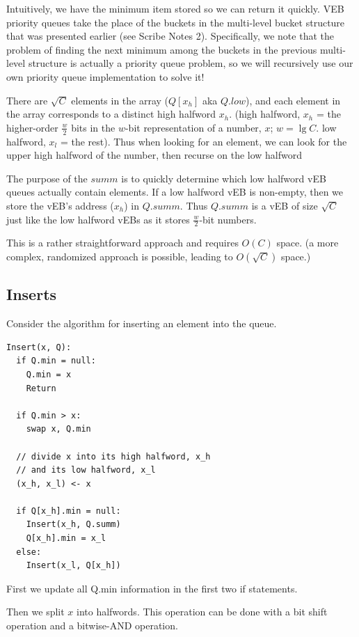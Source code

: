 \documentclass{article}[10pt]
\begin{document}
Intuitively, we have the minimum item stored so we can
return it quickly. VEB priority queues
take the place of the buckets in the multi-level
bucket structure that was presented earlier (see Scribe Notes
2). Specifically, we note that the problem of finding the next minimum
among the buckets in the previous multi-level structure is actually a
priority queue problem, so we will recursively use our own priority
queue implementation to solve it!

There are $\sqrt{C}$ elements in the array ($Q[x_h]$ aka $Q.low$), and
each element in the array corresponds to a distinct high halfword
$x_h$.  (high halfword, $x_h$ = the higher-order $\frac{w}{2}$ bits in
the $w$-bit representation of a number, $x$; $w = \lg C$.  low
halfword, $x_l$ = the rest).  Thus when looking for an element, we can
look for the upper high halfword of the number, then recurse on the
low halfword

The purpose of the $summ$ is to quickly determine which low halfword vEB queues
actually contain elements.
If a low halfword vEB is non-empty, then we store
the vEB's address ($x_h$) in $Q.summ$.  Thus $Q.summ$ is a vEB of size $\sqrt{C}$
just like the low halfword vEBs as it stores $\frac{w}{2}$-bit numbers.

This is a rather straightforward approach and requires $O(C)$ space. (a more complex, randomized
approach is possible, leading to $O(\sqrt{C})$ space.)

\subsection{Inserts}

Consider the algorithm for inserting an element into the queue.

\begin{lstlisting}[mathescape]
Insert(x, Q):
  if Q.min = null:
    Q.min = x
    Return

  if Q.min > x:
    swap x, Q.min

  // divide x into its high halfword, x_h
  // and its low halfword, x_l
  (x_h, x_l) <- x 

  if Q[x_h].min = null:
    Insert(x_h, Q.summ)
    Q[x_h].min = x_l
  else:
    Insert(x_l, Q[x_h])
\end{lstlisting}

First we update all Q.min information in the first two if statements.

Then we split $x$ into halfwords.   This operation
can be done with a bit shift operation and a bitwise-AND operation.
\end{document}
